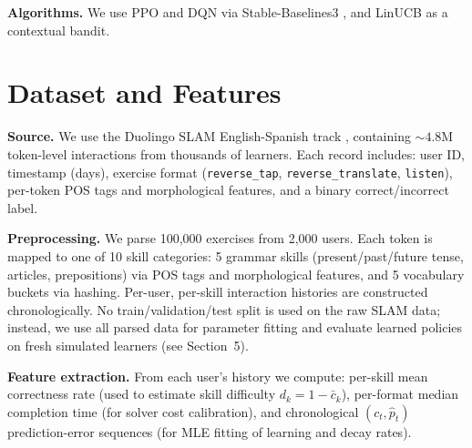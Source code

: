 \documentclass{article}
\begin{document}
\textbf{Algorithms.}
We use PPO \citep{schulman2017ppo} and DQN \citep{mnih2015dqn} via Stable-Baselines3 \citep{sb3}, and LinUCB \citep{li2010linucb} as a contextual bandit.

\section{Dataset and Features}

\textbf{Source.} We use the Duolingo SLAM English-Spanish track \citep{duolingo2018slam}, containing ${\sim}4.8$M token-level interactions from thousands of learners. Each record includes: user ID, timestamp (days), exercise format (\texttt{reverse\_tap}, \texttt{reverse\_translate}, \texttt{listen}), per-token POS tags and morphological features, and a binary correct/incorrect label.

\textbf{Preprocessing.} We parse 100,000 exercises from 2,000 users. Each token is mapped to one of 10 skill categories: 5 grammar skills (present/past/future tense, articles, prepositions) via POS tags and morphological features, and 5 vocabulary buckets via hashing. Per-user, per-skill interaction histories are constructed chronologically. No train/validation/test split is used on the raw SLAM data; instead, we use all parsed data for parameter fitting and evaluate learned policies on fresh simulated learners (see Section~5).

\textbf{Feature extraction.} From each user's history we compute: per-skill mean correctness rate (used to estimate skill difficulty $d_k = 1 - \bar{c}_k$), per-format median completion time (for solver cost calibration), and chronological $(c_t, \hat{p}_t)$ prediction-error sequences (for MLE fitting of learning and decay rates).
\end{document}
